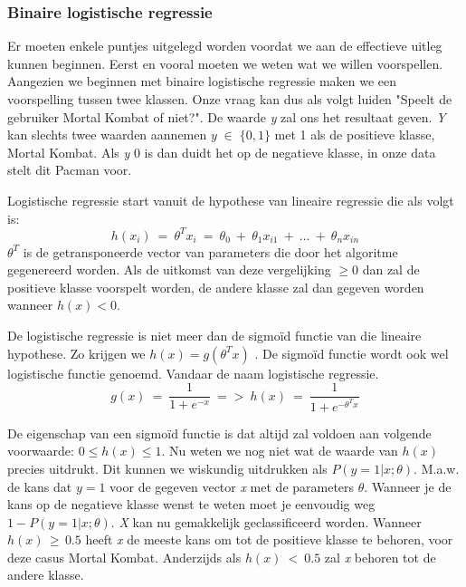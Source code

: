 \subsubsection{Binaire logistische regressie}
\label{sec:Binaire-logistische-regressie}

Er moeten enkele puntjes uitgelegd worden voordat we aan de effectieve uitleg kunnen beginnen. Eerst en vooral moeten we weten wat we willen voorspellen. Aangezien we beginnen met binaire logistische regressie maken we een voorspelling tussen twee klassen. Onze vraag kan dus als volgt luiden "Speelt de gebruiker Mortal Kombat of niet?". De waarde \textit{y} zal ons het resultaat geven. \textit{Y} kan slechts twee waarden aannemen $y \; \in \; \{0,1\}$ met 1 als de positieve klasse, Mortal Kombat. Als \textit{y} 0 is dan duidt het op de negatieve klasse, in onze data stelt dit Pacman voor. 

Logistische regressie start vanuit de hypothese van lineaire regressie die als volgt is: 
$$
h(x_{i}) \:= \: \theta^{T}x_{i} \:=\: \theta_{0} \:+ \:\theta_{1}x_{i1} \:+ \: ...\: + \: \theta_{n}x_{in}
$$
$ \theta^{T}$ is de getransponeerde vector van parameters die door het algoritme gegenereerd worden. Als de uitkomst van deze vergelijking $\geq 0$ dan zal de positieve klasse voorspelt worden, de andere klasse zal dan gegeven worden wanneer $h(x) < 0$. 

De logistische regressie is niet meer dan de sigmoïd functie van die lineaire hypothese. Zo krijgen we $h(x) = g(\theta^{T}x)$ . De sigmoïd functie wordt ook wel logistische functie genoemd. Vandaar de naam logistische regressie. 
$$
g(x) \: = \: {\frac{1}{1+e^{-x}}} \: => \: h(x) \: = \:{\frac{1}{1+e^{-\theta^{T}x }}}
$$

De eigenschap van een sigmoïd functie is dat altijd zal voldoen aan volgende voorwaarde: $ 0 \leq h(x) \leq1$. 
Nu weten we nog niet wat de waarde van $h(x)$ precies uitdrukt. Dit kunnen we wiskundig uitdrukken als $P(y=1|x;\theta)$. M.a.w. de kans dat $y = 1$ voor de gegeven vector \textit{x} met de parameters $\theta$. Wanneer je de kans op de negatieve klasse wenst te weten moet je eenvoudig weg $1 - P(y=1|x;\theta)$. 
\textit{X} kan nu gemakkelijk geclassificeerd worden. Wanneer $h(x)\,\geq\,0.5$ heeft \textit{x} de meeste kans om tot de positieve klasse te behoren, voor deze casus Mortal Kombat. Anderzijds als $h(x)\:<\:0.5$ zal \textit{x} behoren tot de andere klasse. 

